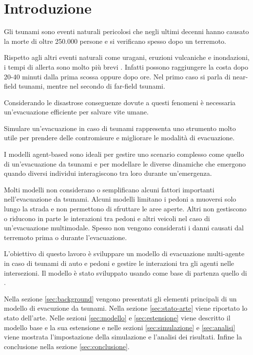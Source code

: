 \section{Introduzione}
Gli tsunami sono eventi naturali pericolosi che negli ultimi decenni 
hanno causato la morte di oltre 250.000 persone e si verificano spesso 
dopo un terremoto.

Rispetto agli altri eventi naturali come uragani, eruzioni vulcaniche e inondazioni, 
i tempi di allerta sono molto più brevi \parencite{katada2006integrated}.
%
Infatti possono raggiungere la costa dopo 20-40 minuti dalla prima scossa oppure dopo ore.
Nel primo caso si parla di near-field tsunami, mentre nel secondo di far-field tsunami. 

Considerando le disastrose conseguenze dovute a questi fenomeni è necessaria un'evacuazione efficiente per salvare vite umane. 

Simulare un'evacuazione in caso di tsunami rappresenta uno strumento molto utile per 
prendere delle contromisure e migliorare le modalità di evacuazione.

I modelli agent-based sono ideali per gestire uno scenario complesso come quello di un'evacuazione da tsunami e
per modellare le diverse dinamiche che emergono quando diversi individui interagiscono tra loro durante un'emergenza. 

Molti modelli non considerano o semplificano alcuni fattori importanti nell'evacuazione da tsunami.
Alcuni modelli limitano i pedoni a muoversi solo lungo la strada e non permettono di sfruttare le aree aperte. 
Altri non gestiscono o riducono in parte le interazioni tra pedoni e altri veicoli nel caso di un'evacuazione multimodale.
%
Spesso non vengono considerati i danni causati dal terremoto prima o durante l'evacuazione.

L'obiettivo di questo lavoro è sviluppare un modello di evacuazione multi-agente in caso di tsunami
di auto e pedoni e gestire le interazioni tra gli agenti nelle intersezioni.
%
Il modello è stato sviluppato usando come base di partenza quello di \textcite{wang2016agent}.

Nella sezione \ref{sec:background} vengono presentati gli elementi principali di un modello di evacuzione da tsunami.
Nella sezione \ref{sec:stato-arte} viene riportato lo stato dell'arte.
%
Nelle sezioni \ref{sec:modello} e \ref{sec:estensione} viene descritto il modello base e la sua estensione e 
nelle sezioni \ref{sec:simulazione} e \ref{sec:analisi} viene mostrata l'impostazione della simulazione e 
l'analisi dei risultati.
%
Infine la conclusione nella sezione \ref{sec:conclusione}.
